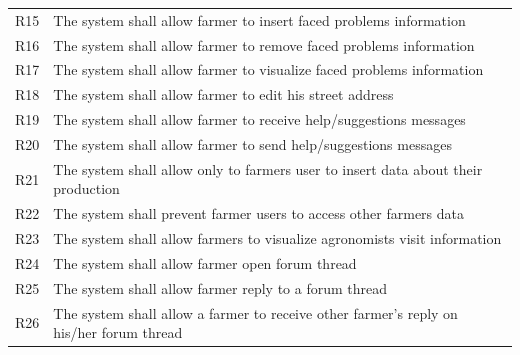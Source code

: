 \begin{center}
\begin{longtable}{|c|m{}|}
            \hline
            \textsc{R15}  &    The system shall allow farmer to insert faced problems information  \\
            \textsc{R16}  &    The system shall allow farmer to remove faced problems information  \\
            \textsc{R17}  &    The system shall allow farmer to visualize faced problems information  \\
            \hline
            \textsc{R18}  &    The system shall allow farmer to edit his street address  \\
            \hline
            \textsc{R19}  &    The system shall allow farmer to receive help/suggestions messages \\
            \textsc{R20}  &    The system shall allow farmer to send help/suggestions messages \\
            \hline
            \textsc{R21}  &    The system shall allow only to farmers user to insert data about their production  \\
            \hline
            \textsc{R22}  &    The system shall prevent farmer users to access other farmers data  \\
            \hline
            \textsc{R23}  &    The system shall allow farmers to visualize agronomists visit information  \\
            \hline
            \textsc{R24}  &    The system shall allow farmer open forum thread  \\
            \hline
            \textsc{R25}  &    The system shall allow farmer reply to a forum thread  \\
            \hline
            \textsc{R26}  &    The system shall allow a farmer to receive other farmer's reply on his/her forum thread  \\
            \hline
            \hline
            \hline
            

\end{longtable}
\end{center}
